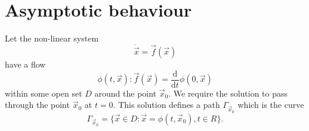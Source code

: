 \section{Asymptotic behaviour}
Let the non-linear system
\begin{equation}
    \label{eqn:system}
    \dot{\vec x} = \vec f(\vec x) 
\end{equation}
have a flow
\begin{equation*}
    \phi(t, \vec x): \vec f(\vec x) = \frac{\mathrm d}{\mathrm dt} \phi(0, \vec x)
\end{equation*}
within some open set $D$ around the point $\vec x_0$. We require the solution to pass through the point $\vec x_0$ at $t = 0$. This solution defines a path $\Gamma_{\vec x_0}$ which is the curve
\begin{equation*}
    \Gamma_{\vec x_0} = \{\vec x \in D: \vec x = \phi(t, \vec x_0), t \in R\}.
\end{equation*}
